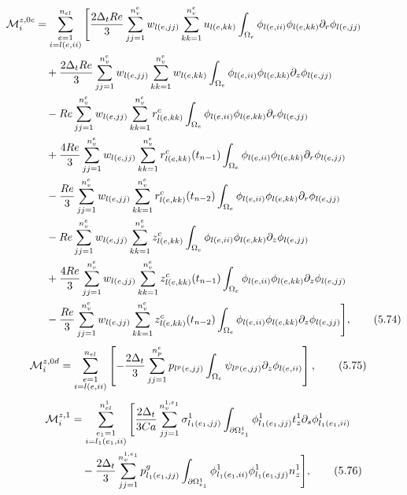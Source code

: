\documentclass{article}
\begin{document}
\begin{align}
\mathcal{M}_i^{z,0c} &= \sum_{\substack{e=1\\ i=l(e,ii)}}^{n_{el}} \Bigg[ \frac{2\Delta_t Re}{3} \sum_{jj=1}^{n_v^e} w_{l(e,jj)} \sum_{kk=1}^{n_v^e} u_{l(e,kk)} \int_{\Omega_e} \phi_{l(e,ii)} \phi_{l(e,kk)} \partial_r \phi_{l(e,jj)} \nonumber\\
&\quad + \frac{2\Delta_t Re}{3} \sum_{jj=1}^{n_v^e} w_{l(e,jj)} \sum_{kk=1}^{n_v^e} w_{l(e,kk)} \int_{\Omega_e} \phi_{l(e,ii)} \phi_{l(e,kk)} \partial_z \phi_{l(e,jj)} \nonumber\\
&\quad - Re \sum_{jj=1}^{n_v^e} w_{l(e,jj)} \sum_{kk=1}^{n_v^e} r_{l(e,kk)}^c \int_{\Omega_e} \phi_{l(e,ii)} \phi_{l(e,kk)} \partial_r \phi_{l(e,jj)} \nonumber\\
&\quad + \frac{4Re}{3} \sum_{jj=1}^{n_v^e} w_{l(e,jj)} \sum_{kk=1}^{n_v^e} r_{l(e,kk)}^c(t_{n-1}) \int_{\Omega_e} \phi_{l(e,ii)} \phi_{l(e,kk)} \partial_r \phi_{l(e,jj)} \nonumber\\
&\quad - \frac{Re}{3} \sum_{jj=1}^{n_v^e} w_{l(e,jj)} \sum_{kk=1}^{n_v^e} r_{l(e,kk)}^c(t_{n-2}) \int_{\Omega_e} \phi_{l(e,ii)} \phi_{l(e,kk)} \partial_r \phi_{l(e,jj)} \nonumber\\
&\quad - Re \sum_{jj=1}^{n_v^e} w_{l(e,jj)} \sum_{kk=1}^{n_v^e} z_{l(e,kk)}^c \int_{\Omega_e} \phi_{l(e,ii)} \phi_{l(e,kk)} \partial_z \phi_{l(e,jj)} \nonumber\\
&\quad + \frac{4Re}{3} \sum_{jj=1}^{n_v^e} w_{l(e,jj)} \sum_{kk=1}^{n_v^e} z_{l(e,kk)}^c(t_{n-1}) \int_{\Omega_e} \phi_{l(e,ii)} \phi_{l(e,kk)} \partial_z \phi_{l(e,jj)} \nonumber\\
&\quad - \frac{Re}{3} \sum_{jj=1}^{n_v^e} w_{l(e,jj)} \sum_{kk=1}^{n_v^e} z_{l(e,kk)}^c(t_{n-2}) \int_{\Omega_e} \phi_{l(e,ii)} \phi_{l(e,kk)} \partial_z \phi_{l(e,jj)} \Bigg], \tag{5.74}
\end{align}
\begin{align}
\mathcal{M}_i^{z,0d} &= \sum_{\substack{e=1\\ i=l(e,ii)}}^{n_{el}} \left[ -\frac{2\Delta_t}{3} \sum_{jj=1}^{n_p^e} p_{l^p(e,jj)} \int_{\Omega_e} \psi_{l^p(e,jj)} \partial_z \phi_{l(e,ii)} \right], \tag{5.75}
\end{align}
\begin{align}
\mathcal{M}_i^{z,1} &= \sum_{\substack{e_1=1\\ i=l_1(e_1,ii)}}^{n_{el}^1} \Bigg[ \frac{2\Delta_t}{3Ca} \sum_{jj=1}^{n_v^{1,e_1}} \sigma_{l_1(e_1,jj)}^1 \int_{\partial \Omega_{e_1}^1} \phi_{l_1(e_1,jj)}^1 t_z^1 \partial_s \phi_{l_1(e_1,ii)}^1 \nonumber\\
&\quad - \frac{2\Delta_t}{3} \sum_{jj=1}^{n_v^{1,e_1}} p_{l_1(e_1,jj)}^g \int_{\partial \Omega_{e_1}^1} \phi_{l_1(e_1,ii)}^1 \phi_{l_1(e_1,jj)}^1 n_z^1 \Bigg], \tag{5.76}
\end{align}
\end{document}
